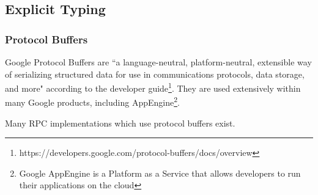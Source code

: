 \subsection{Explicit Typing}



\subsubsection{Protocol Buffers}
Google Protocol Buffers are ``a language-neutral, platform-neutral, extensible way of serializing structured data for use in communications protocols, data storage, and more" according to the developer guide\footnote{https://developers.google.com/protocol-buffers/docs/overview}. They are used extensively within many Google products, including AppEngine\footnote{Google AppEngine is a Platform as a Service that allows developers to run their applications on the cloud}.

Many RPC implementations which use protocol buffers exist.
